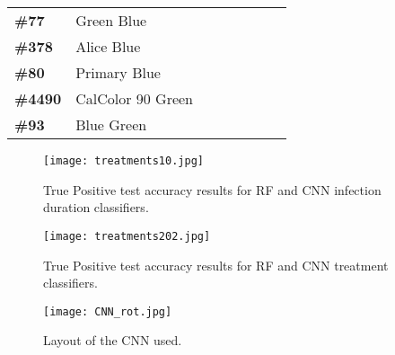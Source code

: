 \documentclass[../../Paper.tex]{subfiles}
\begin{document}
\begin{table}[!b]
\begin{tabular}{|l|l|llllll}
\textbf{\#77}                                                                & Green Blue                                                     &                      &           &           &                      &           &           \\ \cline{1-2}
\textbf{\#378}                                                               & Alice Blue                                                     & \multicolumn{1}{c}{} &           &           & \textbf{}            & \textbf{} & \textbf{} \\ \cline{1-2}
\textbf{\#80}                                                                & Primary Blue                                                   &                      &           &           & \textbf{}            & \textbf{} & \textbf{} \\ \cline{1-2}
\textbf{\#4490}                                                              & CalColor 90 Green                                              &                      &           &           & \textbf{}            & \textbf{} & \textbf{} \\ \cline{1-2}
\textbf{\#93}                                                                & Blue Green                                                     &                      &           &           & \textbf{}            & \textbf{} & \textbf{} \\ \cline{1-2}
\end{tabular}
\end{table}

\recalctypearea    
\begin{figure}[!t]
\texttt{[image: treatments10.jpg]}
\caption{True Positive test accuracy results for RF and CNN infection duration classifiers.}
\end{figure}

\begin{figure*}[!t]
\texttt{[image: treatments202.jpg]}
\caption{True Positive test accuracy results for RF and CNN treatment classifiers.}
\end{figure*}


\begin{figure*}[!b]
\texttt{[image: CNN\_rot.jpg]}
\caption{Layout of the CNN used.}
\end{figure*}
\end{document}
